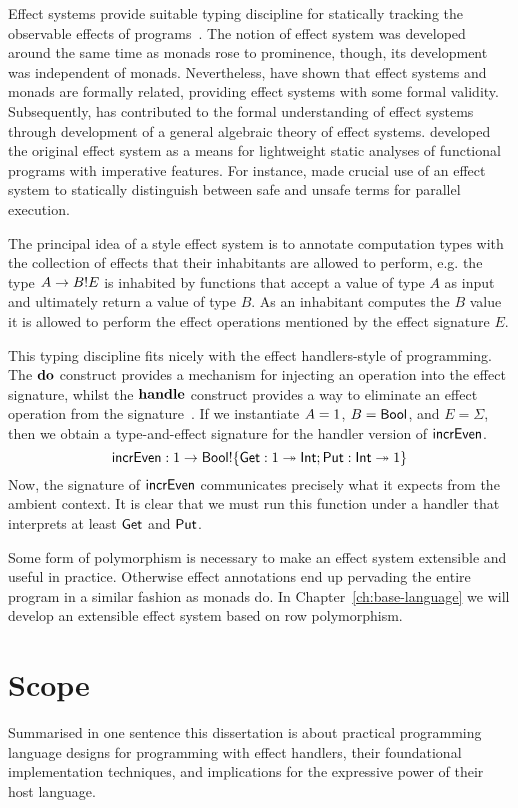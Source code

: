 \documentclass[12pt,phd,lfcs,twoside,openright,logo,leftchapter,normalheadings]{infthesis}
\theoremstyle{plain}
\theoremstyle{definition}
\begin{document}
Effect systems provide suitable typing discipline for statically
tracking the observable effects of programs~\cite{NielsonN99}. The
notion of effect system was developed around the same time as monads
rose to prominence, though, its development was independent of
monads. Nevertheless, \citet{WadlerT03} have shown that effect systems
and monads are formally related, providing effect systems with some
formal validity. Subsequently, \citet{Kammar14} has contributed to the
formal understanding of effect systems through development of a
general algebraic theory of effect systems. \citet{LucassenG88}
developed the original effect system as a means for lightweight static
analyses of functional programs with imperative features. For
instance, \citet{Lucassen87} made crucial use of an effect system to
statically distinguish between safe and unsafe terms for parallel
execution.

The principal idea of a \citeauthor{LucassenG88} style effect system is to
annotate computation types with the collection of effects that their
inhabitants are allowed to perform, e.g. the type $A \to B ! E$ is
inhabited by functions that accept a value of type $A$ as input and
ultimately return a value of type $B$. As an inhabitant computes the
$B$ value it is allowed to perform the effect operations mentioned by
the effect signature $E$.

This typing discipline fits nicely with the effect handlers-style of
programming. The $\mathbf{do}$ construct provides a mechanism for injecting an
operation into the effect signature, whilst the $\mathbf{handle}$ construct
provides a way to eliminate an effect operation from the
signature~\cite{BauerP13,HillerstromL16}.
%
If we instantiate $A = 1$, $B = \mathsf{Bool}$, and $E = \Sigma$, then
we obtain a type-and-effect signature for the handler version of
$\mathsf{incrEven}$.
%
\[
  \mathsf{incrEven} : 1 \to \mathsf{Bool} ! \{\mathsf{Get}:1 \twoheadrightarrow \mathsf{Int};\mathsf{Put}:\mathsf{Int} \twoheadrightarrow 1\}
\]
%
Now, the signature of $\mathsf{incrEven}$ communicates precisely what it
expects from the ambient context. It is clear that we must run this
function under a handler that interprets at least $\mathsf{Get}$ and $\mathsf{Put}$.

Some form of polymorphism is necessary to make an effect system
extensible and useful in practice. Otherwise effect annotations end up
pervading the entire program in a similar fashion as monads do. In
Chapter~\ref{ch:base-language} we will develop an extensible effect
system based on row polymorphism.

\section{Scope}
Summarised in one sentence this dissertation is about practical
programming language designs for programming with effect handlers,
their foundational implementation techniques, and implications for the
expressive power of their host language.
\end{document}
